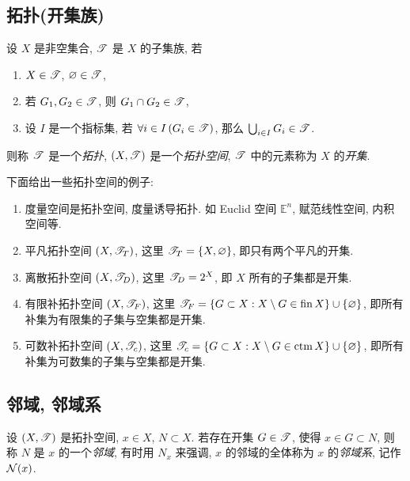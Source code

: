 \subsection{拓扑(开集族)}
    \begin{Definition}[拓扑空间]
        设 $ X $ 是非空集合, $ \mathscr{T} $ 是 $ X $ 的子集族, 若
        \begin{enumerate}[($ \mathrm{O}_1 $), itemindent=2.5\parindent]
            \item $ X\in\mathscr{T} $, $ \varnothing\in\mathscr{T} $,
            \item 若 $ G_{1}, G_{2}\in\mathscr{T} $, 则 $ G_{1}\cap G_{2}\in\mathscr{T} $,
            \item 设 $ I $ 是一个指标集, 若 $ \forall i\in I\,(G_{i}\in\mathscr{T}) $, 那么 $ \bigcup_{i\in I}G_{i}\in\mathscr{T} $.
        \end{enumerate}
        则称 $ \mathscr{T} $ 是一个\emph{拓扑}, $ (X, \mathscr{T}) $ 是一个\emph{拓扑空间}, $ \mathscr{T} $ 中的元素称为 $ X $ 的\emph{开集}.
    \end{Definition}
    \begin{Example}
        下面给出一些拓扑空间的例子:
        \begin{enumerate}
            \item 度量空间是拓扑空间, 度量诱导拓扑. 如 Euclid 空间 $ \mathbb{E}^{n} $, 赋范线性空间, 内积空间等. 
            \item 平凡拓扑空间 $ (X, \mathscr{T}_{T}) $, 这里 $ \mathscr{T}_{T}=\left\{ X, \varnothing \right\} $, 即只有两个平凡的开集.
            \item 离散拓扑空间 $ (X, \mathscr{T}_{D}) $, 这里 $ \mathscr{T}_{D}=2^{X} $, 即 $ X $ 所有的子集都是开集.
            \item 有限补拓扑空间 $ (X, \mathscr{T}_{F}) $, 这里 $ \mathscr{T}_{F}=\left\{ G\subset X: X\setminus G\in\operatorname{fin} X \right\}\cup\left\{ \varnothing \right\} $, 即所有补集为有限集的子集与空集都是开集.
            \item 可数补拓扑空间 $ (X, \mathscr{T}_{c}) $, 这里 $ \mathscr{T}_{c}=\left\{ G\subset X: X\setminus G\in\mathrm{ctm}\,X \right\}\cup\left\{ \varnothing \right\} $, 即所有补集为可数集的子集与空集都是开集.
        \end{enumerate}
    \end{Example}

\subsection{邻域, 邻域系}
    \begin{Definition}[邻域, 邻域系]
        设 $ (X, \mathscr{T}) $ 是拓扑空间, $ x\in X $, $ N\subset X $. 若存在开集 $ G\in\mathscr{T} $, 使得 $ x\in G\subset N $, 则称 $ N $ 是 $ x $ 的一个\emph{邻域}, 有时用 $ N_{x} $ 来强调, $ x $ 的邻域的全体称为 $ x $ 的\emph{邻域系}, 记作 $ \mathcal{N}(x) $.
    \end{Definition}

